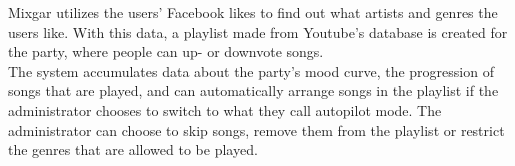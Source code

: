 Mixgar utilizes the users' Facebook likes to find out what artists and genres the users like. With this data, a playlist made from Youtube's database is created for the party, where people can up- or downvote songs.\\

The system accumulates data about the party's mood curve, the progression of songs that are played, and can automatically arrange songs in the playlist if the administrator chooses to switch to what they call autopilot mode.
The administrator can choose to skip songs, remove them from the playlist or restrict the genres that are allowed to be played.